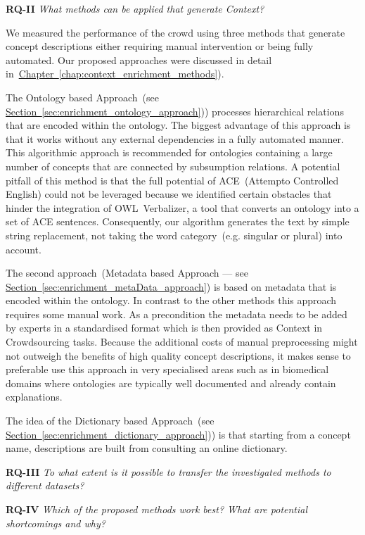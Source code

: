 \textbf{RQ-II} \emph{What methods can be applied that generate Context?}

We measured the performance of the crowd using three methods that generate concept descriptions either requiring manual intervention or being fully automated. Our proposed approaches were discussed in detail in~\hyperref[chap:context_enrichment_methods]{Chapter~\ref*{chap:context_enrichment_methods}}). 

The Ontology based Approach~(see \hyperref[sec:enrichment_ontology_approach]{Section~\ref*{sec:enrichment_ontology_approach}})) processes hierarchical relations that are encoded within the ontology. The biggest advantage of this approach is that it works without any external dependencies in a fully automated manner. This algorithmic approach is recommended for ontologies containing a large number of concepts that are connected by subsumption relations. A potential pitfall of this method is that the full potential of ACE~(Attempto Controlled English) could not be leveraged because we identified certain obstacles that hinder the integration of OWL~Verbalizer, a tool that converts an ontology into a set of ACE sentences. Consequently, our algorithm generates the text by simple string replacement, not taking the word category~(e.g. singular or plural) into account. 

The second approach~(Metadata based Approach --- see \hyperref[sec:enrichment_metaData_approach]{Section~\ref*{sec:enrichment_metaData_approach}})
is based on metadata that is encoded within the ontology. In contrast to the other methods this approach requires some manual work. As a precondition 
the metadata needs to be added by experts in a standardised format which is then provided as Context in Crowdsourcing tasks. Because the additional costs of manual preprocessing might not outweigh the benefits of high quality concept descriptions, it makes sense to preferable use this approach in very specialised areas such as in biomedical domains where ontologies are typically well documented and already contain explanations.

The idea of the Dictionary based Approach~(see \hyperref[sec:enrichment_dictionary_approach]{Section~\ref*{sec:enrichment_dictionary_approach}}))
is that starting from a concept name, descriptions are built from consulting an online dictionary.


\textbf{RQ-III} \emph{To what extent is it possible to transfer the investigated methods to different datasets?}

\textbf{RQ-IV} \emph{Which of the proposed methods work best? What are potential shortcomings and why?} 

